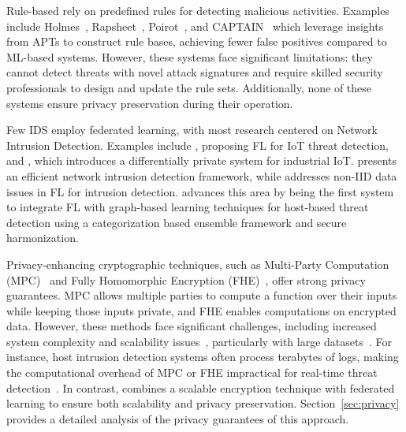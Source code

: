  Rule-based \pids rely on predefined rules for detecting malicious activities. Examples include Holmes~\cite{holmes2019}, Rapsheet~\cite{rapsheet2020}, Poirot~\cite{poirot2019}, and CAPTAIN~\cite{wang2024incorporating} which leverage insights from APTs to construct rule bases, achieving fewer false positives compared to ML-based systems. However, these systems face significant limitations: they cannot detect threats with novel attack signatures and require skilled security professionals to design and update the rule sets. Additionally, none of these systems ensure privacy preservation during their operation.

 Few IDS employ federated learning, with most research centered on Network Intrusion Detection. Examples include \cite{man2021intelligent}, proposing FL for IoT threat detection, and \cite{friha20232df}, which introduces a differentially private system for industrial IoT. \cite{li2023efficient} presents an efficient network intrusion detection framework, while \cite{guo2023new} addresses non-IID data issues in FL for intrusion detection. \Sys advances this area by being the first system to integrate FL with graph-based learning techniques for host-based threat detection using a categorization based \gnnshort ensemble framework and secure \wordvec harmonization.

 Privacy-enhancing cryptographic techniques, such as Multi-Party Computation (MPC)~\cite{cramer2015secure} and Fully Homomorphic Encryption (FHE)~\cite{armknecht2015guide}, offer strong privacy guarantees. MPC allows multiple parties to compute a function over their inputs while keeping those inputs private, and FHE enables computations on encrypted data. However, these methods face significant challenges, including increased system complexity and scalability issues~\cite{du2001secure, gentry2009fully, asharov2013more}, particularly with large datasets~\cite{menezes2018handbook}. For instance, host intrusion detection systems often process terabytes of logs, making the computational overhead of MPC or FHE impractical for real-time threat detection~\cite{loggc}. In contrast, \Sys combines a scalable encryption technique with federated learning to ensure both scalability and privacy preservation. Section~\ref{sec:privacy} provides a detailed analysis of the privacy guarantees of this approach.

